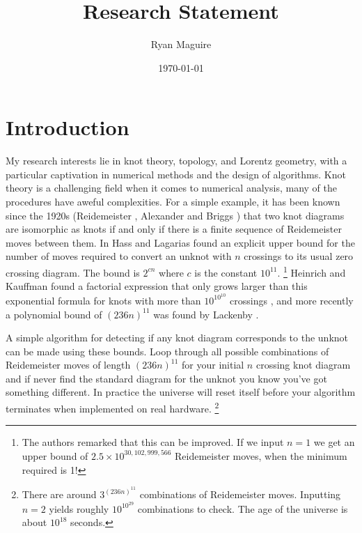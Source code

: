 \documentclass{article}
\title{Research Statement}
\author{Ryan Maguire}
\date{\today}
\theoremstyle{plain}
\begin{document}
    \maketitle
    \section{Introduction}
        My research interests lie in knot theory, topology, and Lorentz
        geometry, with a particular captivation in numerical methods and the
        design of algorithms. Knot theory is a challenging field when it comes
        to numerical analysis, many of the procedures have aweful complexities.
        For a simple example, it has been known since the 1920s
        (Reidemeister \cite{Reidemeister1927}, Alexander and Briggs
        \cite{AlexanderBriggs1926}) that two knot diagrams are isomorphic as
        knots if and only if there is a finite sequence of Reidemeister moves
        between them. In \cite{HassLagarias2001} Hass and Lagarias found an
        explicit upper bound for the number of moves required to convert an
        unknot with $n$ crossings to its usual zero crossing diagram. The
        bound is $2^{cn}$ where $c$ is the constant $10^{11}$.%
        \footnote{%
            The authors remarked that this can be improved.
            If we input $n=1$ we get an upper bound of
            $2.5\times{10}^{30,102,999,566}$ Reidemeister moves,
            when the minimum required is 1!
        }
        Heinrich and Kauffman found a factorial expression that only grows
        larger than this exponential formula for knots with more than
        $10^{10^{10}}$ crossings \cite{HenrichKauffman2010Unknotting}, and
        more recently a polynomial bound of
        $(236n)^{11}$ was found by Lackenby \cite{Lackenby2015Unknotting}.
        \par\hfill\par
        A simple algorithm for detecting if any knot diagram corresponds to the
        unknot can be made using these bounds. Loop through all possible
        combinations of Reidemeister moves of length $(236n)^{11}$ for your
        initial $n$ crossing knot diagram and if never
        find the standard diagram for the unknot you know you've got something
        different. In practice the universe will reset itself before your
        algorithm terminates when implemented on real hardware.%
        \footnote{%
            There are around $3^{(236n)^{11}}$ combinations of Reidemeister
            moves. Inputting $n=2$ yields roughly $10^{10^{29}}$ combinations
            to check. The age of the universe is about $10^{18}$ seconds.
        }
\end{document}
